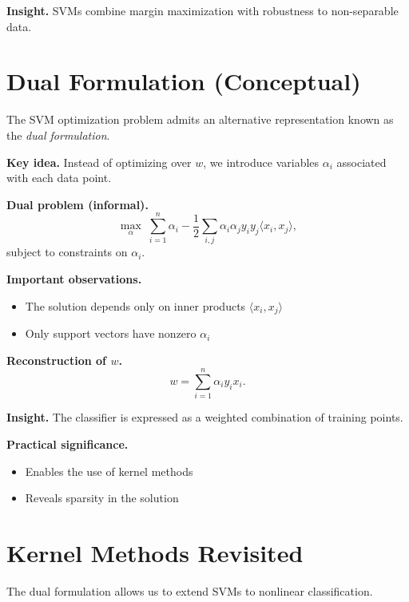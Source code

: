 \medskip

\noindent
\textbf{Insight.}  
SVMs combine margin maximization with robustness to non-separable data.

\section{Dual Formulation (Conceptual)}

The SVM optimization problem admits an alternative representation known as the \emph{dual formulation}.

\medskip

\noindent
\textbf{Key idea.}  
Instead of optimizing over $w$, we introduce variables $\alpha_i$ associated with each data point.

\medskip

\noindent
\textbf{Dual problem (informal).}
\[
\max_{\alpha} \; \sum_{i=1}^n \alpha_i - \frac{1}{2} \sum_{i,j} \alpha_i \alpha_j y_i y_j \langle x_i, x_j \rangle,
\]
subject to constraints on $\alpha_i$.

\medskip

\noindent
\textbf{Important observations.}
\begin{itemize}
    \item The solution depends only on inner products $\langle x_i, x_j \rangle$
    \item Only support vectors have nonzero $\alpha_i$
\end{itemize}

\medskip

\noindent
\textbf{Reconstruction of $w$.}
\[
w = \sum_{i=1}^n \alpha_i y_i x_i.
\]

\medskip

\noindent
\textbf{Insight.}  
The classifier is expressed as a weighted combination of training points.

\medskip

\noindent
\textbf{Practical significance.}
\begin{itemize}
    \item Enables the use of kernel methods
    \item Reveals sparsity in the solution
\end{itemize}

\section{Kernel Methods Revisited}

The dual formulation allows us to extend SVMs to nonlinear classification.


